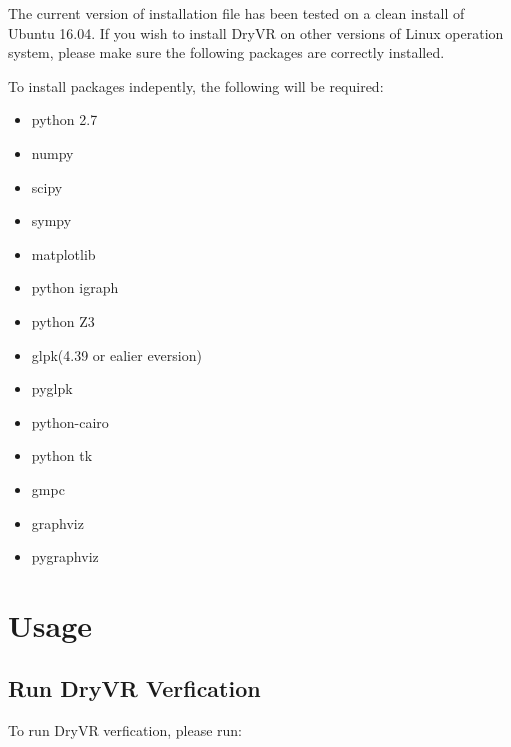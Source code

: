 \documentclass[letterpaper,10pt,english]{sphinxmanual}
\begin{document}
The current version of installation file has been tested on a clean
install of Ubuntu 16.04. If you wish to install DryVR on other versions of Linux operation system, please make sure the following packages are correctly installed.

To install packages indepently, the following will be required:
\begin{itemize}
\item {} 
python 2.7

\item {} 
numpy

\item {} 
scipy

\item {} 
sympy

\item {} 
matplotlib

\item {} 
python igraph

\item {} 
python Z3

\item {} 
glpk(4.39 or ealier eversion)

\item {} 
pyglpk

\item {} 
python-cairo

\item {} 
python tk

\item {} 
gmpc

\item {} 
graphviz

\item {} 
pygraphviz

\end{itemize}


\chapter{Usage}
\label{\detokenize{usage:usage}}\label{\detokenize{usage::doc}}

\section{Run DryVR Verfication}
\label{\detokenize{usage:run-dryvr-verfication}}
To run DryVR verfication, please run:

\begin{sphinxVerbatim}[commandchars=\\\{\}]
  \PYG{p}{[}\PYG{p}{]}
\end{sphinxVerbatim}
\end{document}
